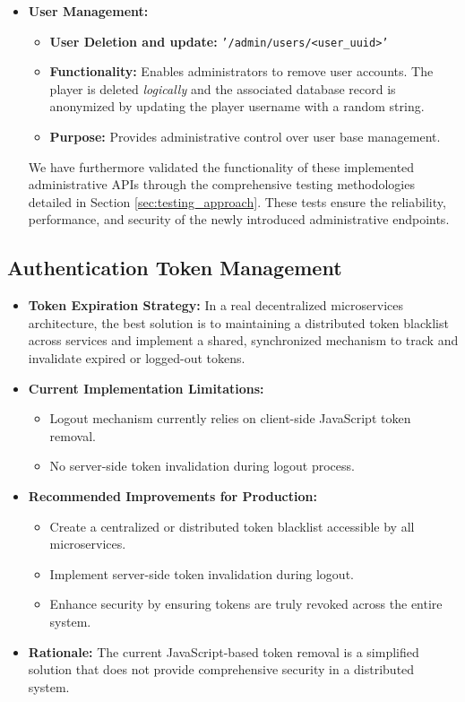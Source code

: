 \documentclass{article}
\begin{document}
\begin{itemize}
    \item \textbf{User Management:}
          \begin{itemize}
              \item \textbf{User Deletion and update:} \texttt{'/admin/users/<user\_uuid>'}
              \item \textbf{Functionality:} Enables administrators to remove user accounts. The player is deleted \emph{logically} and the associated database record is anonymized by updating the player username with a random string.
              \item \textbf{Purpose:} Provides administrative control over user base management.
          \end{itemize}
          We have furthermore validated the functionality of these implemented administrative APIs through the comprehensive testing methodologies detailed in Section \ref{sec:testing_approach}. These tests ensure the reliability, performance, and security of the newly introduced administrative endpoints.
\end{itemize}

\subsection{Authentication Token Management}
\begin{itemize}
    \item \textbf{Token Expiration Strategy:} In a real decentralized microservices architecture, the best solution is to maintaining a distributed token blacklist across services and implement a shared, synchronized mechanism to track and invalidate expired or logged-out tokens.
    \item \textbf{Current Implementation Limitations:}
          \begin{itemize}
              \item Logout mechanism currently relies on client-side JavaScript token removal.
              \item No server-side token invalidation during logout process.
          \end{itemize}
    \item \textbf{Recommended Improvements for Production:}
          \begin{itemize}
              \item Create a centralized or distributed token blacklist accessible by all microservices.
              \item Implement server-side token invalidation during logout.
              \item Enhance security by ensuring tokens are truly revoked across the entire system.
          \end{itemize}
    \item \textbf{Rationale:} The current JavaScript-based token removal is a simplified solution that does not provide comprehensive security in a distributed system.
\end{itemize}
\end{document}
